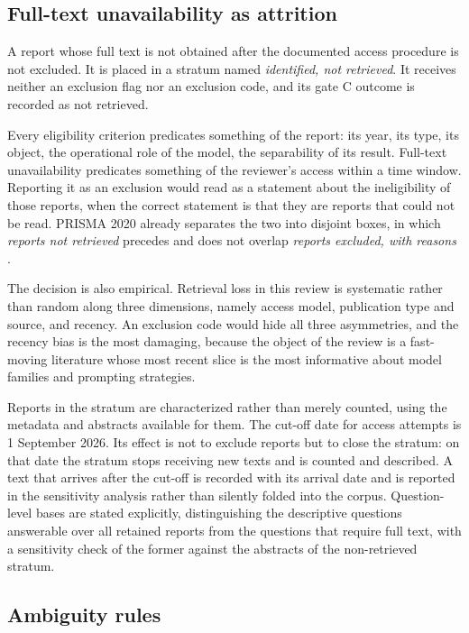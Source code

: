 \subsection{Full-text unavailability as attrition}
\label{sec:protocol_attrition}

A report whose full text is not obtained after the documented access procedure is not excluded. It is placed in a stratum named \textit{identified, not retrieved}. It receives neither an exclusion flag nor an exclusion code, and its gate C outcome is recorded as not retrieved.

Every eligibility criterion predicates something of the report: its year, its type, its object, the operational role of the model, the separability of its result. Full-text unavailability predicates something of the reviewer's access within a time window. Reporting it as an exclusion would read as a statement about the ineligibility of those reports, when the correct statement is that they are reports that could not be read. PRISMA 2020 already separates the two into disjoint boxes, in which \textit{reports not retrieved} precedes and does not overlap \textit{reports excluded, with reasons} \cite{Page2021PRISMA}.

The decision is also empirical. Retrieval loss in this review is systematic rather than random along three dimensions, namely access model, publication type and source, and recency. An exclusion code would hide all three asymmetries, and the recency bias is the most damaging, because the object of the review is a fast-moving literature whose most recent slice is the most informative about model families and prompting strategies.

Reports in the stratum are characterized rather than merely counted, using the metadata and abstracts available for them. The cut-off date for access attempts is 1 September 2026. Its effect is not to exclude reports but to close the stratum: on that date the stratum stops receiving new texts and is counted and described. A text that arrives after the cut-off is recorded with its arrival date and is reported in the sensitivity analysis rather than silently folded into the corpus. Question-level bases are stated explicitly, distinguishing the descriptive questions answerable over all retained reports from the questions that require full text, with a sensitivity check of the former against the abstracts of the non-retrieved stratum.

\subsection{Ambiguity rules}

